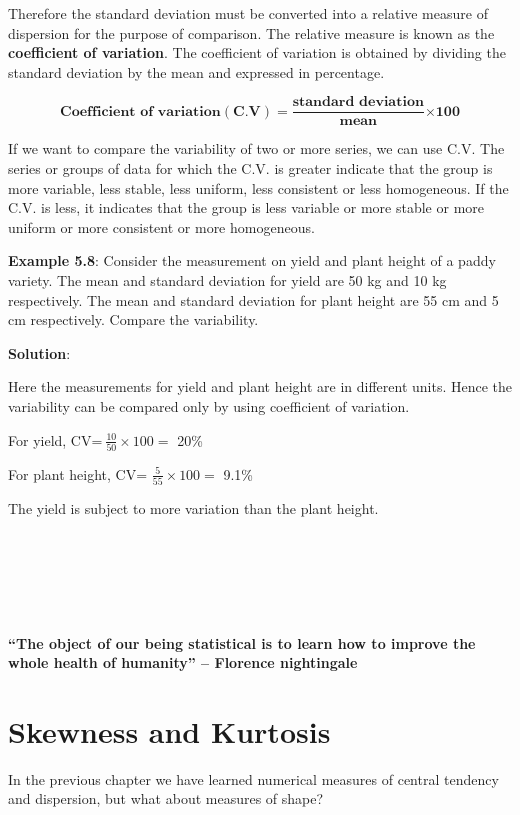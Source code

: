 \documentclass[
]{book}
\begin{document}
Therefore the standard deviation must be converted into a relative
measure of dispersion for the purpose of comparison. The relative
measure is known as the \textbf{coefficient of variation}. The coefficient of
variation is obtained by dividing the standard deviation by the mean and
expressed in percentage.

\[\mathbf{\text{Coefficient of variation}}\left( \mathbf{C}\mathbf{.}\mathbf{V} \right)\mathbf{=}\frac{\mathbf{\text{standard deviation}}}{\mathbf{\text{mean}}}\mathbf{\times 100}\]

If we want to compare the variability of two or more series, we can use
C.V. The series or groups of data for which the C.V. is greater indicate
that the group is more variable, less stable, less uniform, less
consistent or less homogeneous. If the C.V. is less, it indicates that
the group is less variable or more stable or more uniform or more
consistent or more homogeneous.

\textbf{Example 5.8}: Consider the measurement on yield and plant height of a
paddy variety. The mean and standard deviation for yield are 50 kg and
10 kg respectively. The mean and standard deviation for plant height are
55 cm and 5 cm respectively. Compare the variability.

\textbf{Solution}:

Here the measurements for yield and plant height are in different units.
Hence the variability can be compared only by using coefficient of
variation.

For yield, CV=\(\ \frac{10}{50} \times 100 =\) 20\%

For plant height, CV= \(\frac{5}{55} \times 100 =\) 9.1\%

The yield is subject to more variation than the plant height.

~\\
\strut ~\\
\strut ~

\label{hello}
\textbf{``The object of our being statistical is to learn how to improve the whole health of humanity'' -- Florence nightingale}

\chapter{Skewness and Kurtosis}\label{skewness-and-kurtosis}

In the previous chapter we have learned numerical measures of central tendency and dispersion, but what about measures of shape?
\end{document}
